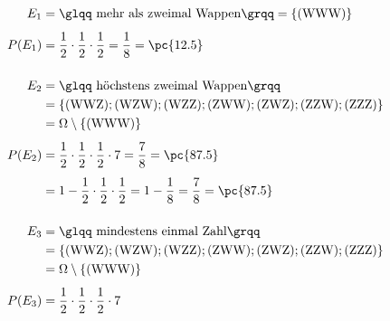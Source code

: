 \begin{exercise}
\begin{center}
    \end{center}
    \begin{equation*}
      \begin{split}
        E_1&=\text{\glqq mehr als zweimal Wappen\grqq}
        =\{(\text{WWW})\}
        \\[1ex]
        P(E_1)&=\frac{1}{2}\cdot\frac{1}{2}\cdot\frac{1}{2}
        =\frac{1}{8}
        =\pc{12.5}
        \\[3ex]
        E_2&=\text{\glqq höchstens zweimal Wappen\grqq}
        \\
        &=\{
          (\text{WWZ});
          (\text{WZW});
          (\text{WZZ});
          (\text{ZWW});
          (\text{ZWZ});
          (\text{ZZW});
          (\text{ZZZ})
         \}
        \\
        &=\Omega\setminus\{(\text{WWW})\}
        \\[1ex]
        P(E_2)&=\frac{1}{2}\cdot\frac{1}{2}\cdot\frac{1}{2}\cdot7
        =\frac{7}{8}
        =\pc{87.5}
        \\[1ex]
        &=1-\frac{1}{2}\cdot\frac{1}{2}\cdot\frac{1}{2}
        =1-\frac{1}{8}
        =\frac{7}{8}
        =\pc{87.5}
        \\[3ex]
        E_3&=\text{\glqq mindestens einmal Zahl\grqq}
        \\
        &=\{
          (\text{WWZ});
          (\text{WZW});
          (\text{WZZ});
          (\text{ZWW});
          (\text{ZWZ});
          (\text{ZZW});
          (\text{ZZZ})
         \}
        \\
        &=\Omega\setminus\{(\text{WWW})\}
        \\[1ex]
        P(E_3)&=\frac{1}{2}\cdot\frac{1}{2}\cdot\frac{1}{2}\cdot7

\end{split}
\end{equation*}
\end{exercise}
